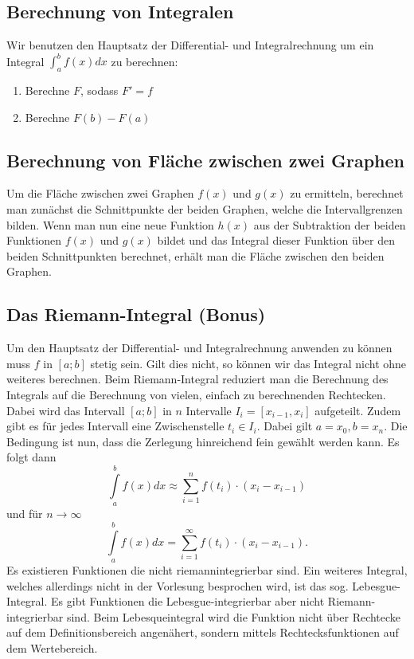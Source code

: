 
\subsection{Berechnung von Integralen}
Wir benutzen den Hauptsatz der Differential- und Integralrechnung um ein Integral $\int_a^b f(x) dx$ zu berechnen:
\begin{enumerate}
\item Berechne $F$, sodass $F' = f$
\item Berechne $F(b)-F(a)$
\end{enumerate}

\subsection{Berechnung von Fläche zwischen zwei Graphen}
Um die Fläche zwischen zwei Graphen $f(x)$ und $g(x)$ zu ermitteln, berechnet man zunächst die Schnittpunkte der beiden Graphen, welche die Intervallgrenzen bilden. Wenn man nun eine neue Funktion $h(x)$ aus der Subtraktion der beiden Funktionen $f(x)$ und $g(x)$ bildet und das Integral dieser Funktion über den beiden Schnittpunkten berechnet, erhält man die Fläche zwischen den beiden Graphen.

\subsection{Das Riemann-Integral (Bonus)}
Um den Hauptsatz der Differential- und Integralrechnung anwenden zu können muss $f$ in $\left[a;b\right]$ stetig sein. Gilt dies nicht, so können wir das Integral nicht ohne weiteres berechnen. Beim Riemann-Integral reduziert man die Berechnung des Integrals auf die Berechnung von vielen, einfach zu berechnenden Rechtecken. Dabei wird das Intervall $\left[a;b \right]$ in $n$ Intervalle $I_i = \left[x_{i-1}, x_i \right]$ aufgeteilt. Zudem gibt es für jedes Intervall eine Zwischenstelle $t_i \in I_i$. Dabei gilt $a = x_0, b = x_n$. Die Bedingung ist nun, dass die Zerlegung hinreichend fein gewählt werden kann. Es folgt dann
\begin{equation*}
\int\limits_a^b f(x) dx \approx \sum\limits_{i=1}^n f(t_i) \cdot (x_{i} - x_{i-1})
\end{equation*}
und für $n \to \infty$
\begin{equation*}
\int\limits_a^b f(x) dx = \sum\limits_{i=1}^\infty f(t_i) \cdot (x_{i} - x_{i-1}).
\end{equation*}
Es existieren Funktionen die nicht riemannintegrierbar sind. Ein weiteres Integral, welches allerdings nicht in der Vorlesung besprochen wird, ist das sog. Lebesgue-Integral. Es gibt Funktionen die Lebesgue-integrierbar aber nicht Riemann-integrierbar sind. Beim Lebesqueintegral wird die Funktion nicht über Rechtecke auf dem Definitionsbereich angenähert, sondern mittels Rechtecksfunktionen auf dem Wertebereich.

